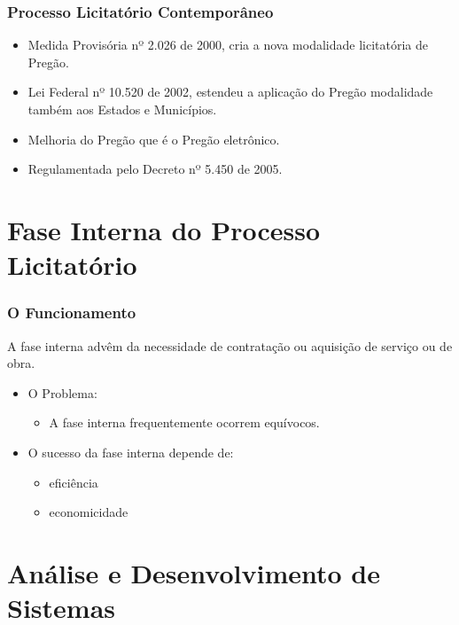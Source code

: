 \documentclass{beamer}
\begin{document}
		\begin{frame}\frametitle{Processo Licitatório Contemporâneo}
			\begin{itemize}
				\item Medida Provisória nº 2.026 de 2000, cria a nova modalidade licitatória de Pregão.
				\item Lei Federal nº 10.520 de 2002, estendeu a aplicação do Pregão modalidade também aos Estados e Municípios.
				\item Melhoria do Pregão que é o Pregão eletrônico.
				\item Regulamentada pelo Decreto nº 5.450 de 2005.
			\end{itemize}
		\end{frame}
		
	\section{Fase Interna do Processo Licitatório}
		\begin{frame}\frametitle{O Funcionamento}
			A fase interna advêm da necessidade de contratação ou aquisição de serviço ou de obra.
			\begin{itemize}
				\item O Problema:
				\begin{itemize}
					\item A fase interna frequentemente ocorrem equívocos.
				\end{itemize}
			
				\item O sucesso da fase interna depende de:
				\begin{itemize}
					\item eficiência
					\item economicidade
				\end{itemize}
			\end{itemize}
		\end{frame}

	\section{Análise e Desenvolvimento de Sistemas}
	
\end{document}
